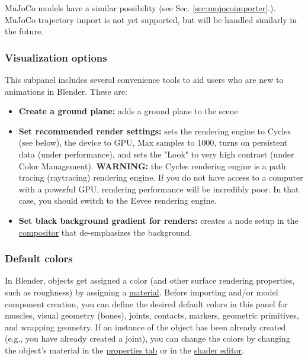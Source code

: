 \documentclass{article}
\begin{document}
MuJoCo models have a similar possibility (see Sec. \ref{sec:mujocoimporter}.). MuJoCo trajectory import is not yet supported, but will be handled similarly in the future.

\subsubsection{Visualization options}

This subpanel includes several convenience tools to aid users who are new to animations in Blender. These are:

\begin{itemize}
    
    \item \textbf{Create a ground plane:} adds a ground plane to the scene
    \item \textbf{Set recommended render settings:} sets the rendering engine to Cycles (see below), the device to GPU, Max samples to 1000, turns on persistent data (under performance), and sets the "Look" to very high contrast (under Color Management). \textbf{WARNING:} the Cycles rendering engine is a path tracing (raytracing) rendering engine. If you do not have access to a computer with a powerful GPU, rendering performance will be incredibly poor. In that case, you should switch to the Eevee rendering engine.
    \item \textbf{Set black background gradient for renders:} creates a node setup in the \href{https://docs.blender.org/manual/en/latest/compositing/index.html}{compositor} that de-emphasizes the background.
\end{itemize}


\subsubsection{Default colors}
\label{sec:defaultcolors}

In Blender, objects get assigned a color (and other surface rendering properties, such as roughness) by assigning a \href{https://docs.blender.org/manual/en/latest/editors/properties_editor.html}{material}. Before importing and/or model component creation, you can define the desired default colors in this panel for muscles, visual geometry (bones), joints, contacts, markers, geometric primitives, and wrapping geometry. If an instance of the object has been already created (e.g., you have already created a joint), you can change the colors by changing the object's material in the \href{https://docs.blender.org/manual/en/latest/editors/properties_editor.html}{properties tab} or in the \href{https://docs.blender.org/manual/en/latest/editors/shader_editor.html}{shader editor}. 
\end{document}
